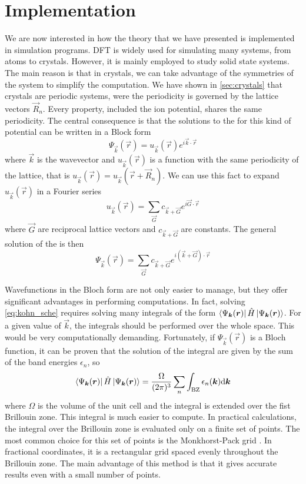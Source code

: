 \section{Implementation}
We are now interested in how the theory that we have presented is implemented in simulation programs. DFT is widely used for simulating many systems, from atoms to crystals. However, it is mainly employed to study solid state systems. The main reason is that in crystals, we can take advantage of the symmetries of the system to simplify the computation. We have shown in \cref{sec:crystals} that crystals are periodic systems, were the periodicity is governed by the lattice vectors $\vec{R}_n$. Every property, included the ion potential, shares the same periodicity. The central consequence is that the solutions to the \sche for this kind of potential can be written in a Block form
\begin{equation}
    \Psi_{\vec{k}}(\vec{r}) = u_{\vec{k}}(\vec{r}) e^{i\vec{k}\cdot\vec{r}}
\end{equation}
where $\vec{k}$ is the wavevector and $u_{\vec{k}}(\vec{r})$ is a function with the same periodicity of the lattice, that is $u_{\vec{k}}(\vec{r}) = u_{\vec{k}}(\vec{r}+\vec{R}_n)$. We can use this fact to expand $u_{\vec{k}}(\vec{r})$ in a Fourier series
\begin{equation}
    u_{\vec{k}}(\vec{r}) = \sum_\vec{G} c_{\vec{k}+\vec{G}} e^{i\vec{G}\cdot\vec{r}}
\end{equation}
where $\vec{G}$ are reciprocal lattice vectors and $c_{\vec{k}+\vec{G}}$ are constants. The general solution of the \sche is then
\begin{equation} \label{eq:sum_bloch}
    \Psi_{\vec{k}}(\vec{r}) = \sum_\vec{G} c_{\vec{k}+\vec{G}} e^{i(\vec{k}+\vec{G})\cdot\vec{r}}
\end{equation}

Wavefunctions in the Bloch form are not only easier to manage, but they offer significant advantages in performing computations. In fact, solving \cref{eq:kohn_sche} requires solving many integrals of the form $\bra{\Psi_{\mathbf{\boldsymbol{k}}}(\mathbf{\boldsymbol{r}})} \hat{H} \ket{\Psi_{\mathbf{\boldsymbol{k}}}(\mathbf{\boldsymbol{r}})}$. For a given value of $\vec{k}$, the integrals should be performed over the whole space. This would be very computationally demanding. Fortunately, if $\Psi_{\vec{k}}(\vec{r})$ is a Bloch function, it can be proven that the solution of the integral are given by the sum of the band energies $\epsilon_n$, so
\begin{equation}
    \bra{\Psi_{\vec{k}}(\vec{r})} \oper{H} \ket{\Psi_{\vec{k}}(\vec{r})} = \frac{\Omega}{(2\pi)^3} \sum_n \int_\text{BZ} \epsilon_n(\vec{k})\differential \vec{k}
\end{equation}
where $\Omega$ is the volume of the unit cell and the integral is extended over the fist Brillouin zone. This integral is much easier to compute. In practical calculations, the integral over the Brillouin zone is evaluated only on a finite set of points. The most common choice for this set of points is the Monkhorst-Pack grid \cite{monkhorst1976}. In fractional coordinates, it is a rectangular grid spaced evenly throughout the Brillouin zone. The main advantage of this method is that it gives accurate results even with a small number of points.

